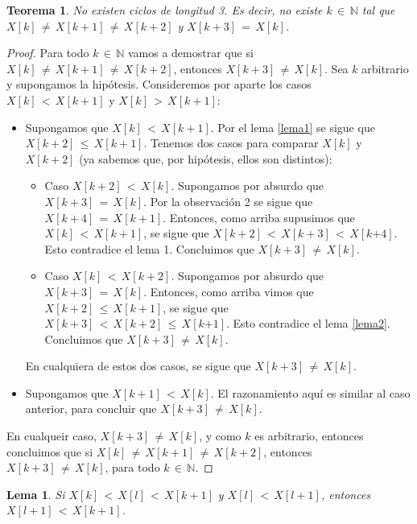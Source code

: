 \documentclass{article}
\newtheorem{teor}{Teorema}
\newtheorem{lema}{Lema}
\begin{document}
\begin{teor}
No existen ciclos de longitud 3. Es decir, no existe $k\,{\in}\,\mathbb{N}$ tal que $X[k]\,{\neq}\, X[k{+}1]\,{\neq}\, X[k{+}2]$ y $X[k{+}3]\,{=}\,X[k]$. 
\end{teor}
\begin{proof}
Para todo $k\,{\in}\,\mathbb{N}$ vamos a demostrar que si $X[k]\,{\neq}\, X[k{+}1]\,{\neq}\, X[k{+}2]$, entonces $X[k{+}3]\,{\neq}\,X[k]$. Sea $k$ arbitrario y supongamos la hipótesis. Consideremos por aparte los casos $X[k]\,{<}\, X[k{+}1]$ y $X[k]\,{>}\, X[k{+}1]$:
%
\begin{itemize}
\item Supongamos que $X[k]\,{<}\, X[k{+}1]$. Por el lema \ref{lema1} se sigue que $X[k{+}2]\,{\leq}\, X[k{+}1]$. Tenemos dos casos para comparar $X[k]$ y $X[k{+}2]$ (ya sabemos que, por hipótesis, ellos son distintos):
	\begin{itemize}
	\item Caso $X[k{+}2]\,{<}\,X[k]$. Supongamos por absurdo que $X[k{+}3]\,{=}\,X[k]$. Por la observación 2 se sigue que $X[k{+}4]\,{=}\,X[k{+}1]$. Entonces, como arriba supusimos que $X[k]\,{<}\, X[k{+}1]$, se sigue que $X[k{+}2]\,{<}\,X[k{+}3]\,{<}\,X[k{+4}]$. Esto contradice el lema 1. Concluimos que $X[k{+}3]\,{\neq}\,X[k]$.
	\item Caso $X[k]\,{<}\,X[k{+}2]$. Supongamos por absurdo que $X[k{+}3]\,{=}\,X[k]$. Entonces, como arriba vimos que $X[k{+}2]\,{\leq}\, X[k{+}1]$, se sigue que $X[k{+}3]\,{<}\,X[k{+}2]\,{\leq}\,X[k{+1}]$. Esto contradice el lema \ref{lema2}. Concluimos que $X[k{+}3]\,{\neq}\,X[k]$.
	\end{itemize}
	En cualquiera de estos dos casos, se sigue que $X[k{+}3]\,{\neq}\,X[k]$.

\item Supongamos que $X[k{+}1]\,{<}\, X[k]$. El razonamiento aquí es similar al caso anterior, para concluir que $X[k{+}3]\,{\neq}\,X[k]$.
\end{itemize}
En cualqueir caso, $X[k{+}3]\,{\neq}\,X[k]$, y como $k$ es arbitrario, entonces concluimos que si $X[k]\,{\neq}\, X[k{+}1]\,{\neq}\, X[k{+}2]$, entonces $X[k{+}3]\,{\neq}\,X[k]$, para todo $k\,{\in}\,\mathbb{N}$.
\end{proof}

\begin{lema}\label{lema3}
Si $X[k]\,{<}\,X[l]\,{<}\,X[k{+}1]$ y $X[l]\,{<}\,X[l{+}1]$, entonces $X[l{+}1]\,{<}\,X[k{+}1]$.
\end{lema}
\end{document}
